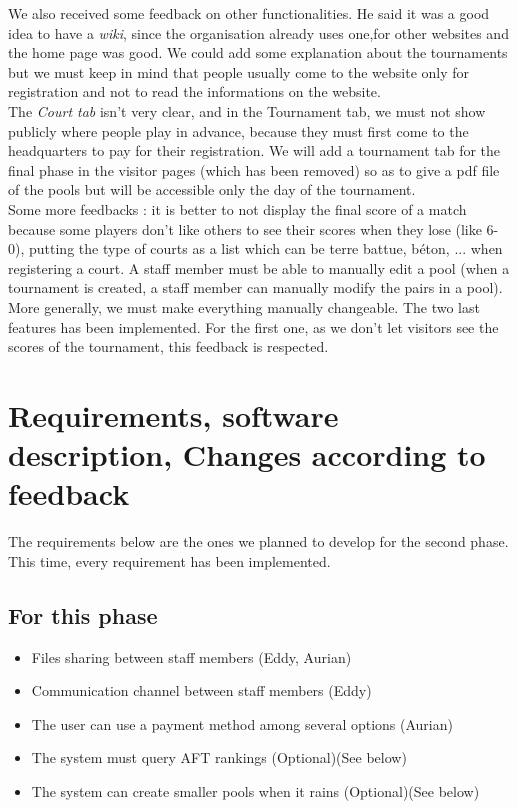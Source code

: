 \documentclass[a4paper, 12pt]{article}
\begin{document}
We also received some feedback on other functionalities. He said it was a good idea to have a \textit{wiki}, since the organisation already uses one,for other websites and the home page was good. We could add some explanation about the tournaments but we must keep in mind that people usually come to the website only for registration and not to read the informations on the website.\\ 

The \textit{Court tab} isn't very clear, and in the Tournament tab, we must not show publicly where people play in advance, because they must first come to the headquarters to pay for their registration. We will add a tournament tab for the final phase in the visitor pages (which has been removed) so as to give a pdf file of the pools but will be accessible only the day of the tournament.\\

Some more feedbacks : it is better to not display the final score of a match because some players don't like others to see their scores when they lose (like 6-0), putting the type of courts  as a list which can be terre battue, béton, ... when registering a court. A staff member must be able to manually edit a pool (when a tournament is created, a staff member can manually modify the pairs in a pool). More generally, we must make everything manually changeable.
The two last features has been implemented. For the first one, as we don't let visitors see the scores of the tournament, this feedback is respected.
\newpage
\section{Requirements, software description, Changes according to feedback}

The requirements below are the ones we planned to develop for the second phase. This time, every requirement has been implemented. \\
\subsection{For this phase}
	
\begin{itemize}
 
\item Files sharing between staff members (Eddy, Aurian)
\item Communication channel between staff members (Eddy)
\item The user can use a payment method among several options (Aurian)
\item The system must query AFT rankings (Optional)(See below)
\item The system can create smaller pools when it rains (Optional)(See below)
\\
\end{itemize}
\end{document}
